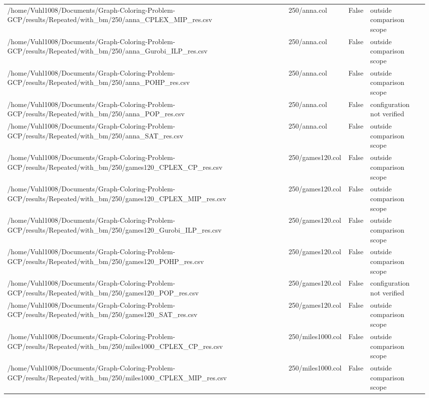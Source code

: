 \begin{table}[htbp]
\begin{tabular}{llll}
/home/Vuhl1008/Documents/Graph-Coloring-Problem-GCP/results/Repeated/with\_bm/250/anna\_CPLEX\_MIP\_res.csv & 250/anna.col & False & outside comparison scope \\
/home/Vuhl1008/Documents/Graph-Coloring-Problem-GCP/results/Repeated/with\_bm/250/anna\_Gurobi\_ILP\_res.csv & 250/anna.col & False & outside comparison scope \\
/home/Vuhl1008/Documents/Graph-Coloring-Problem-GCP/results/Repeated/with\_bm/250/anna\_POHP\_res.csv & 250/anna.col & False & outside comparison scope \\
/home/Vuhl1008/Documents/Graph-Coloring-Problem-GCP/results/Repeated/with\_bm/250/anna\_POP\_res.csv & 250/anna.col & False & configuration not verified \\
/home/Vuhl1008/Documents/Graph-Coloring-Problem-GCP/results/Repeated/with\_bm/250/anna\_SAT\_res.csv & 250/anna.col & False & outside comparison scope \\
/home/Vuhl1008/Documents/Graph-Coloring-Problem-GCP/results/Repeated/with\_bm/250/games120\_CPLEX\_CP\_res.csv & 250/games120.col & False & outside comparison scope \\
/home/Vuhl1008/Documents/Graph-Coloring-Problem-GCP/results/Repeated/with\_bm/250/games120\_CPLEX\_MIP\_res.csv & 250/games120.col & False & outside comparison scope \\
/home/Vuhl1008/Documents/Graph-Coloring-Problem-GCP/results/Repeated/with\_bm/250/games120\_Gurobi\_ILP\_res.csv & 250/games120.col & False & outside comparison scope \\
/home/Vuhl1008/Documents/Graph-Coloring-Problem-GCP/results/Repeated/with\_bm/250/games120\_POHP\_res.csv & 250/games120.col & False & outside comparison scope \\
/home/Vuhl1008/Documents/Graph-Coloring-Problem-GCP/results/Repeated/with\_bm/250/games120\_POP\_res.csv & 250/games120.col & False & configuration not verified \\
/home/Vuhl1008/Documents/Graph-Coloring-Problem-GCP/results/Repeated/with\_bm/250/games120\_SAT\_res.csv & 250/games120.col & False & outside comparison scope \\
/home/Vuhl1008/Documents/Graph-Coloring-Problem-GCP/results/Repeated/with\_bm/250/miles1000\_CPLEX\_CP\_res.csv & 250/miles1000.col & False & outside comparison scope \\
/home/Vuhl1008/Documents/Graph-Coloring-Problem-GCP/results/Repeated/with\_bm/250/miles1000\_CPLEX\_MIP\_res.csv & 250/miles1000.col & False & outside comparison scope \\

\end{tabular}
\end{table}
